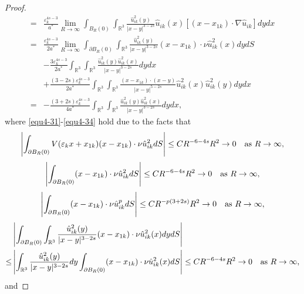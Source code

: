 \documentclass[reqno, 11pt]{amsart} %
\numberwithin{equation}{section}
\begin{document}
\begin{proof}
\begin{equation}
\begin{split}
				=&\frac{\varepsilon_{k}^{4s-3}}{a^{\ast}}\lim_{R\rightarrow\infty}\int_{ B_{R}(0)}\int_{\mathbb{R}^{3}}\frac{\hat{u}_{ik}^{2}(y)}{|x-y|^{3-2s}}\hat{u}_{ik}(x)[(x-x_{1k})\cdot\nabla\hat{u}_{ik}]dydx\\
				=&\frac{\varepsilon_{k}^{4s-3}}{2a^{\ast}}\lim_{ R\rightarrow\infty}\int_{ \partial B_{R}(0)}\int_{\mathbb{R}^{3}}\frac{\hat{u}_{ik}^{2}(y)}{|x-y|^{3-2s}}(x-x_{1k})\cdot\nu\hat{u}_{ik}^{2}(x)dydS\\
				&-\frac{3\varepsilon_{k}^{4s-3}}{2a^{\ast}}\int_{\mathbb{R}^{3}}\int_{\mathbb{R}^{3}}\frac{\hat{u}_{ik}^{2}(y)\hat{u}_{ik}^{2}(x)}{|x-y|^{3-2s}}dydx\\
				&+\frac{(3-2s)\varepsilon_{k}^{4s-3}}{2a^{\ast}}\int_{\mathbb{R}^{3}}\int_{\mathbb{R}^{3}}\frac{(x-x_{1k})\cdot(x-y)}{|x-y|^{5-2s}}\hat{u}^{2}_{ik}(x)\hat{u}^{2}_{ik}(y)dydx\\
				=&-\frac{(3+2s)\varepsilon_{k}^{4s-3}}{4a^{\ast}}\int_{\mathbb{R}^{3}}\int_{\mathbb{R}^{3}}\frac{\hat{u}_{ik}^{2}(y)\hat{u}_{ik}^{2}(x)}{|x-y|^{3-2s}}dydx,
			\end{split}
		\end{equation}
		where \eqref{equ4-31}-\eqref{equ4-34} hold due to the facts that
		\begin{equation*}
			\left| \int_{\partial B_{R}(0)}V(\varepsilon_{k}x+x_{1k})(x-x_{1k})\cdot\nu\hat{u}_{ik}^{2}dS\right|
			\leq CR^{-6-4s}R^{2}\rightarrow0\quad \hbox{as $R\rightarrow\infty$},
		\end{equation*}
		\begin{equation*}
			\left| \int_{\partial B_{R}(0)}(x-x_{1k})\cdot\nu\hat{u}_{ik}^{2}dS\right|
			\leq CR^{-6-4s}R^{2}\rightarrow0\quad \hbox{as $R\rightarrow\infty$},
		\end{equation*}
		\begin{equation*}
			\left| \int_{\partial B_{R}(0)}(x-x_{1k})\cdot\nu\hat{u}_{ik}^{p}dS\right| \leq CR^{-p(3+2s)}R^{2}\rightarrow0\quad \hbox{as $R\rightarrow\infty$},
		\end{equation*}
		\begin{align*} 
			&	\left| \int_{ \partial B_{R}(0)}\int_{\mathbb{R}^{3}}\frac{\hat{u}_{ik}^{2}(y)}{|x-y|^{3-2s}}(x-x_{1k})\cdot\nu\hat{u}_{ik}^{2}(x)dydS\right| \\
			\leq&\left| \int_{\mathbb{R}^{3}}\frac{\hat{u}_{ik}^{2}(y)}{|x-y|^{3-2s}}dy\int_{ \partial B_{R}(0)}(x-x_{1k})\cdot\nu\hat{u}_{ik}^{2}(x)dS\right| \leq CR^{-6-4s}R^{2}\rightarrow0\quad \hbox{as $R\rightarrow\infty$},
		\end{align*}
		and

\end{proof}
\end{document}
